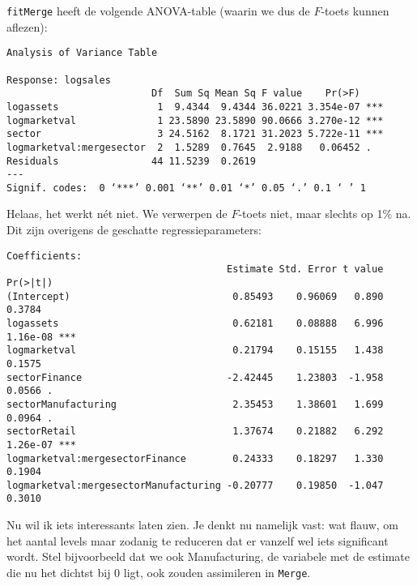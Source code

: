 \documentclass[a4paper]{report}
\begin{document}
  \verb!fitMerge! heeft de volgende ANOVA-table (waarin we dus de $F$-toets kunnen aflezen):
  
  
\begin{verbatim}
Analysis of Variance Table

Response: logsales
                         Df  Sum Sq Mean Sq F value    Pr(>F)    
logassets                 1  9.4344  9.4344 36.0221 3.354e-07 ***
logmarketval              1 23.5890 23.5890 90.0666 3.270e-12 ***
sector                    3 24.5162  8.1721 31.2023 5.722e-11 ***
logmarketval:mergesector  2  1.5289  0.7645  2.9188   0.06452 .  
Residuals                44 11.5239  0.2619                      
---
Signif. codes:  0 ‘***’ 0.001 ‘**’ 0.01 ‘*’ 0.05 ‘.’ 0.1 ‘ ’ 1
\end{verbatim}

  Helaas, het werkt n\' et niet. We verwerpen de $F$-toets niet, maar slechts op 1\% na. Dit zijn overigens de geschatte regressieparameters:
  
\begin{verbatim}
Coefficients:
                                      Estimate Std. Error t value Pr(>|t|)    
(Intercept)                            0.85493    0.96069   0.890   0.3784    
logassets                              0.62181    0.08888   6.996 1.16e-08 ***
logmarketval                           0.21794    0.15155   1.438   0.1575    
sectorFinance                         -2.42445    1.23803  -1.958   0.0566 .  
sectorManufacturing                    2.35453    1.38601   1.699   0.0964 .  
sectorRetail                           1.37674    0.21882   6.292 1.26e-07 ***
logmarketval:mergesectorFinance        0.24333    0.18297   1.330   0.1904    
logmarketval:mergesectorManufacturing -0.20777    0.19850  -1.047   0.3010    
\end{verbatim}
  

  Nu wil ik iets interessants laten zien. Je denkt nu namelijk vast: wat flauw, om het aantal levels maar zodanig te reduceren dat er vanzelf wel iets significant wordt. Stel bijvoorbeeld dat we ook Manufacturing, de variabele met de estimate die nu het dichtst bij 0 ligt, ook zouden assimileren in \verb!Merge!.
  
\end{document}
